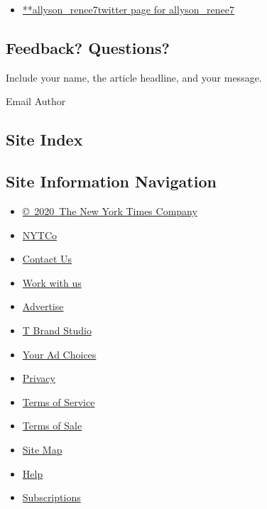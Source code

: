 \begin{itemize}
\tightlist
\item
  \href{https://twitter.com/allyson_renee7}{**allyson\_renee7twitter
  page for allyson\_renee7}
\end{itemize}

\hypertarget{feedback-questions}{%
\subsection{Feedback? Questions?}\label{feedback-questions}}

Include your name, the article headline, and your message.

Email Author

\hypertarget{site-index}{%
\subsection{Site Index}\label{site-index}}

\hypertarget{site-information-navigation}{%
\subsection{Site Information
Navigation}\label{site-information-navigation}}

\begin{itemize}
\tightlist
\item
  \href{https://help.nytimes.com/hc/en-us/articles/115014792127-Copyright-notice}{©~2020~The
  New York Times Company}
\end{itemize}

\begin{itemize}
\tightlist
\item
  \href{https://www.nytco.com/}{NYTCo}
\item
  \href{https://help.nytimes.com/hc/en-us/articles/115015385887-Contact-Us}{Contact
  Us}
\item
  \href{https://www.nytco.com/careers/}{Work with us}
\item
  \href{https://nytmediakit.com/}{Advertise}
\item
  \href{http://www.tbrandstudio.com/}{T Brand Studio}
\item
  \href{https://www.nytimes.com/privacy/cookie-policy\#how-do-i-manage-trackers}{Your
  Ad Choices}
\item
  \href{https://www.nytimes.com/privacy}{Privacy}
\item
  \href{https://help.nytimes.com/hc/en-us/articles/115014893428-Terms-of-service}{Terms
  of Service}
\item
  \href{https://help.nytimes.com/hc/en-us/articles/115014893968-Terms-of-sale}{Terms
  of Sale}
\item
  \href{https://spiderbites.nytimes.com}{Site Map}
\item
  \href{https://help.nytimes.com/hc/en-us}{Help}
\item
  \href{https://www.nytimes.com/subscription?campaignId=37WXW}{Subscriptions}
\end{itemize}
